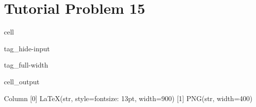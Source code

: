 \documentclass[letterpaper,10pt,english]{jupyterBook}
\begin{document}
\section{Tutorial Problem 15}
\label{\detokenize{content/tutorials/T5/tutorial_05:tutorial-problem-15}}
\begin{sphinxuseclass}{cell}
\begin{sphinxuseclass}{tag_hide-input}
\begin{sphinxuseclass}{tag_full-width}\begin{sphinxVerbatimOutput}

\begin{sphinxuseclass}{cell_output}
\begin{sphinxVerbatim}[commandchars=\\\{\}]
Column
    [0] LaTeX(str, style=\PYGZob{}\PYGZsq{}font\PYGZhy{}size\PYGZsq{}: \PYGZsq{}13pt\PYGZsq{}\PYGZcb{}, width=900)
    [1] PNG(str, width=400)
\end{sphinxVerbatim}

\end{sphinxuseclass}\end{sphinxVerbatimOutput}

\end{sphinxuseclass}
\end{sphinxuseclass}
\end{sphinxuseclass}
\end{document}
